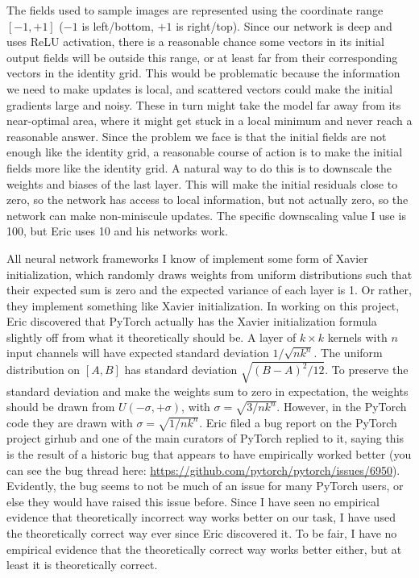 \documentclass[12pt,a4paper]{article}
\begin{document}
The fields used to sample images are represented using the coordinate range $[-1, +1]$ ($-1$ is left/bottom, $+1$ is right/top). Since our network is deep and uses ReLU activation, there is a reasonable chance some vectors in its initial output fields will be outside this range, or at least far from their corresponding vectors in the identity grid. This would be problematic because the information we need to make updates is local, and scattered vectors could make the initial gradients large and noisy. These in turn might take the model far away from its near-optimal area, where it might get stuck in a local minimum and never reach a reasonable answer. Since the problem we face is that the initial fields are not enough like the identity grid, a reasonable course of action is to make the initial fields more like the identity grid. A natural way to do this is to downscale the weights and biases of the last layer. This will make the initial residuals close to zero, so the network has access to local information, but not actually zero, so the network can make non-miniscule updates. The specific downscaling value I use is 100, but Eric uses 10 and his networks work.

All neural network frameworks I know of implement some form of Xavier initialization, which randomly draws weights from uniform distributions such that their expected sum is zero and the expected variance of each layer is 1. Or rather, they implement something like Xavier initialization. In working on this project, Eric discovered that PyTorch actually has the Xavier initialization formula slightly off from what it theoretically should be. A layer of $k \times k$ kernels with $n$ input channels will have expected standard deviation ${1} / {\sqrt{nk^n}}$. The uniform distribution on $[A, B]$ has standard deviation $\sqrt{{(B-A)^2} / {12}}$. To preserve the standard deviation and make the weights sum to zero in expectation, the weights should be drawn from $U(-\sigma, +\sigma)$, with $\sigma = \sqrt{ {3} / nk^n }$. However, in the PyTorch code they are drawn with $\sigma = \sqrt{ {1} / nk^n }$. Eric filed a bug report on the PyTorch project girhub and one of the main curators of PyTorch replied to it, saying this is the result of a historic bug that appears to have empirically worked better (you can see the bug thread here: \href{https://github.com/pytorch/pytorch/issues/6950}{https://github.com/pytorch/pytorch/issues/6950}). Evidently, the bug seems to not be much of an issue for many PyTorch users, or else they would have raised this issue before. Since I have seen no empirical evidence that theoretically incorrect way works better on our task, I have used the theoretically correct way ever since Eric discovered it. To be fair, I have no empirical evidence that the theoretically correct way works better either, but at least it is theoretically correct.
\end{document}

